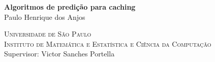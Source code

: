 \thispagestyle{empty}

\begin{center}
    \vspace*{2.6cm}
    \textbf{\Large{Algoritmos de predição para caching}}\\

    \vspace*{1.3cm}
    \Large{Paulo Henrique dos Anjos}

    \vspace*{2.2cm} \textsc{
      Universidade de São Paulo\\[-0.12cm]
      Instituto de Matemática e Estatística e Ciência da Computação\\[-0.12cm]
    }
  \vskip 1.6cm
    Supervisor: Victor Sanches Portella\\
\end{center}
